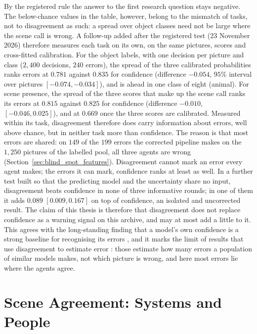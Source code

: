 By the registered rule the answer to the first research question stays negative. The below-chance values in the table, however, belong to the mismatch of tasks, not to disagreement as such: a spread over object classes need not be large where the scene call is wrong. A follow-up added after the registered test (23 November 2026) therefore measures each task on its own, on the same pictures, scores and cross-fitted calibration. For the object labels, with one decision per picture and class ($2{,}400$ decisions, $240$ errors), the spread of the three calibrated probabilities ranks errors at $0.781$ against $0.835$ for confidence (difference $-0.054$, $95\%$ interval over pictures $[-0.074, -0.034]$), and is ahead in one class of eight (animal). For scene presence, the spread of the three scores that make up the scene call ranks its errors at $0.815$ against $0.825$ for confidence (difference $-0.010$, $[-0.046, 0.025]$), and at $0.669$ once the three scores are calibrated. Measured within its task, disagreement therefore does carry information about errors, well above chance, but in neither task more than confidence. The reason is that most errors are shared: on $149$ of the $199$ errors the corrected pipeline makes on the $1{,}250$ pictures of the labelled pool, all three agents are wrong (Section~\ref{sec:blind_spot_features}). Disagreement cannot mark an error every agent makes; the errors it can mark, confidence ranks at least as well. In a further test built so that the predicting model and the uncertainty share no input, disagreement beats confidence in none of three informative rounds; in one of them it adds $0.089$ $[0.009, 0.167]$ on top of confidence, an isolated and uncorrected result. The claim of this thesis is therefore that disagreement does not replace confidence as a warning signal on this archive, and may at most add a little to it. This agrees with the long-standing finding that a model's own confidence is a strong baseline for recognising its errors \cite{hendrycks2017baseline}, and it marks the limit of results that use disagreement to estimate error \cite{jiang2022disagreement,baek2022agreement}: those estimate how many errors a population of similar models makes, not which picture is wrong, and here most errors lie where the agents agree.

\section{Scene Agreement: Systems and People}
\label{sec:scene_agreement}

